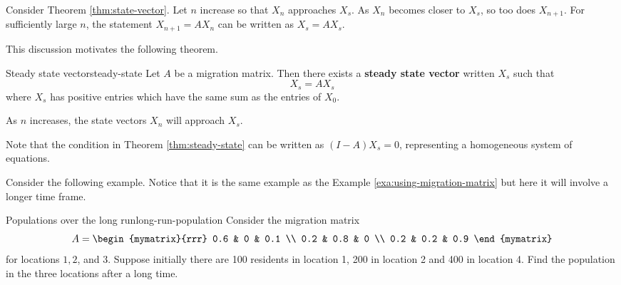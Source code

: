 Consider Theorem \ref{thm:state-vector}. Let $n$ increase so that $X_n$ approaches $X_s$. As $X_n$ becomes closer to $X_s$, so too does $X_{n+1}$. For sufficiently large $n$, the statement $X_{n+1} = AX_n$ can be written as $X_s = AX_s$. 

This discussion motivates the following theorem.

\begin{theorem}{Steady state vector}{steady-state}
Let $A$ be a migration matrix. Then there exists a \textbf{steady state vector} written $X_s$ such that 
\[
X_s = AX_s
\]
where $X_s$ has positive entries which have the same sum as the entries of $X_0$. 

As $n$ increases, the state vectors $X_n$ will approach $X_s$. 
\end{theorem}

Note that the condition in Theorem \ref{thm:steady-state} can be written as $(I - A)X_s=0$, representing a homogeneous system of equations. 

Consider the following example. Notice that it is the same example as the Example \ref{exa:using-migration-matrix} but here it will
involve a longer time frame.

\begin{example}{Populations over the long run}{long-run-population}
Consider the migration matrix 
\begin{equation*}
A
=
\begin{mymatrix}{rrr}
0.6 & 0 & 0.1 \\
0.2 & 0.8 & 0 \\
0.2 & 0.2 & 0.9
\end{mymatrix} 
\end{equation*}
 for locations $1,2$, and $3$. Suppose initially there are 100
residents in location 1, 200 in location 2 and 400 in location 4. Find the
population in the three locations after a long time.
\end{example}

